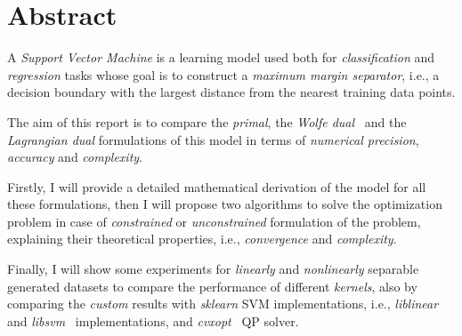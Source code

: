 \section{Abstract}

A \emph{Support Vector Machine} is a learning model used both for \emph{classification} and \emph{regression} tasks whose goal is to construct a \emph{maximum margin separator}, i.e., a decision boundary with the largest distance from the nearest training data points.

The aim of this report is to compare the \emph{primal}, the \emph{Wolfe dual}~\cite{fletcher2009support} and the \emph{Lagrangian dual} formulations of this model in terms of \emph{numerical precision}, \emph{accuracy} and \emph{complexity}.

Firstly, I will provide a detailed mathematical derivation of the model for all these formulations, then I will propose two algorithms to solve the optimization problem in case of \emph{constrained} or \emph{unconstrained} formulation of the problem, explaining their theoretical properties, i.e., \emph{convergence} and \emph{complexity}.

Finally, I will show some experiments for \emph{linearly} and \emph{nonlinearly} separable generated datasets to compare the performance of different \emph{kernels}, also by comparing the \emph{custom} results with \emph{sklearn} SVM implementations, i.e., \emph{liblinear}~\cite{fan2008liblinear} and \emph{libsvm}~\cite{chang2011libsvm} implementations, and \emph{cvxopt}~\cite{vandenberghe2010cvxopt} QP solver.
